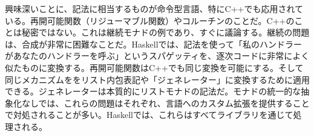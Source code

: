 興味深いことに、記法に相当するものが命令型言語、特にC++でも応用されている。再開可能関数（リジューマブル関数）やコルーチンのことだ。C++のことは秘密ではない。これは継続モナドの例であり、すぐに議論する。継続の問題は、合成が非常に困難なことだ。Haskellでは、記法を使って「私のハンドラーがあなたのハンドラーを呼ぶ」というスパゲッティを、逐次コードに非常によく似たものに変換する。再開可能関数はC++でも同じ変換を可能にする。そして同じメカニズムををリスト内包表記や「ジェネレーター」に変換するために適用できる。ジェネレーターは本質的にリストモナドの記法だ。モナドの統一的な抽象化なしでは、これらの問題はそれぞれ、言語へのカスタム拡張を提供することで対処されることが多い。Haskellでは、これらはすべてライブラリを通じて処理される。
